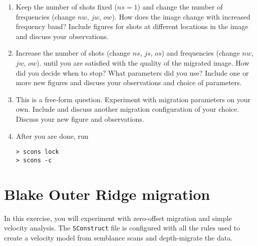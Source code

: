 \begin{enumerate}

\item
Keep the number of shots fixed ($ns=1$) 
and change the number of frequencies 
(change $nw$, $jw$, $ow$).
How does the image change with increased frequency band?
Include figures for shots at different locations in the 
image and discuss your observations.


\item
Increase the number of shots 
(change $ns$, $js$, $os$)
and frequencies 
(change $nw$, $jw$, $ow$).
until you are satisfied with the quality of the migrated image.
How did you decide when to stop?
What parameters did you use?
Include one or more new figures and discuss your 
observations and choice of parameters.


\item
This is a free-form question.
Experiment with migration parameters on your own.
Include and discuss another migration configuration
of your choice. Discuss your new figure and observations.


\item After you are done, run

\begin{verbatim}
> scons lock
> scons -c
\end{verbatim} 
  
\end{enumerate}


\section{Blake Outer Ridge migration}
In this exercise, you will experiment with zero-offset 
migration and simple velocity analysis.
The \texttt{SConstruct} file is configured with all the rules
used to create a velocity model from semblance scans and
depth-migrate the data.






